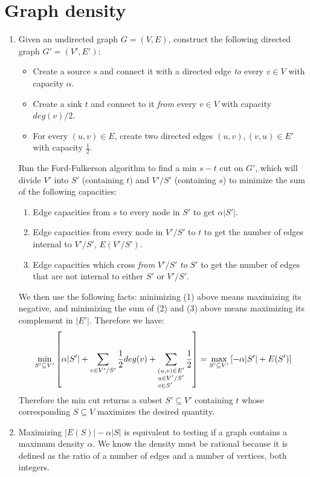 \documentclass[12pt]{article}
\begin{document}
\section{Graph density}
\begin{enumerate}
\item %
Given an undirected graph $G=(V,E)$, construct the following directed graph
$G'=(V',E')$:

\begin{itemize}
\item
Create a source $s$ and connect it with a directed edge \textit{to}
every $v \in V$ with capacity $\alpha$.
\item
Create a sink $t$ and connect to it \textit{from} every $v \in V$
with capacity $deg(v)/2$.
\item
For every $(u,v) \in E$, create two directed edges $(u,v),(v,u) \in E'$
with capacity $\frac{1}{2}$.
\end{itemize}
%
Run the Ford-Fulkerson algorithm to find a min $s-t$ cut on $G'$, which will
divide $V'$ into $S'$ (containing $t$) and $V'/S'$ (containing $s$) to
minimize the sum of the following capacities:
%
\begin{enumerate}
\item Edge capacities from $s$ to every node in $S'$ to get $\alpha|S'|$.
\item Edge capacities from every node in $V'/S'$ to $t$ to get the number
of edges internal to $V'/S'$, $E(V'/S')$.
\item Edge capacities which cross \textit{from} $V'/S'$ \textit{to} $S'$ to
get the number of edges that are not internal to either $S'$ or $V'/S'$.
\end{enumerate}
%
We then use the following facts: minimizing (1) above means maximizing its
negative, and minimizing the sum of (2) and (3) above means maximizing
its complement in $|E'|$. Therefore we have:
\begin{displaymath}
\displaystyle \min_{S' \subseteq V'}\left[\alpha|S'| + \sum_{v \in V'/S'}\frac{1}{2}deg(v) +
\sum_{\begin{subarray}{l}
(u,v) \in E'\\u \in V'/S'\\v \in S' \end{subarray}}\frac{1}{2}\right] =
\max_{S' \subseteq V'}\left[-\alpha|S'| + E(S')\right]
\end{displaymath}
Therefore the min cut returns a subset $S' \subseteq V'$ containing $t$
whose corresponding $S \subseteq V$ maximizes the desired quantity.
\item %
Maximizing $|E(S)|-\alpha|S|$ is equivalent to testing if a graph contains
a maximum density $\alpha$. We know the density must be 
rational because it is defined as the ratio of a number of edges and
a number of vertices, both integers.


\end{enumerate}
\end{document}
